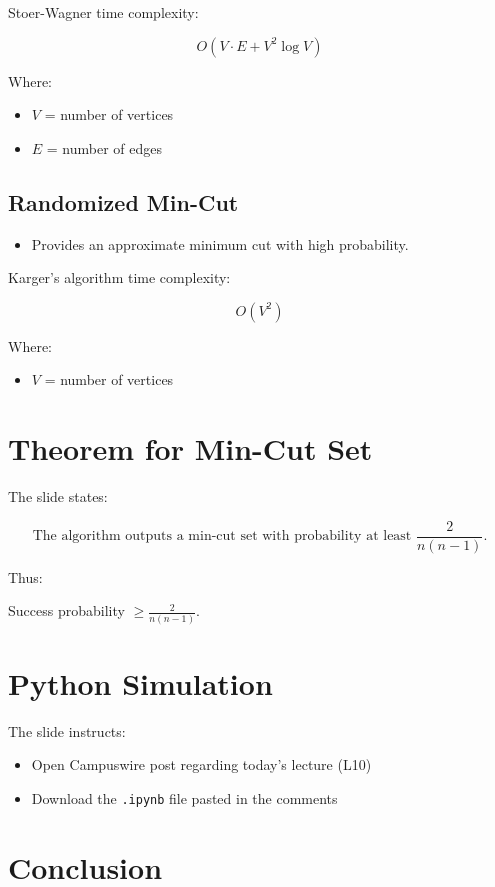 \documentclass[12pt]{article}
\begin{document}
Stoer-Wagner time complexity:

\[
O(V \cdot E + V^2 \log V)
\]

Where:
\begin{itemize}
    \item $V$ = number of vertices
    \item $E$ = number of edges
\end{itemize}

\subsection*{Randomized Min-Cut}

\begin{itemize}
    \item Provides an approximate minimum cut with high probability.
\end{itemize}

Karger’s algorithm time complexity:

\[
O(V^2)
\]

Where:
\begin{itemize}
    \item $V$ = number of vertices
\end{itemize}

\section{Theorem for Min-Cut Set}

The slide states:

\[
\text{The algorithm outputs a min-cut set with probability at least } \frac{2}{n(n-1)}.
\]

Thus:

Success probability $\ge \frac{2}{n(n-1)}$.

\section{Python Simulation}

The slide instructs:

\begin{itemize}
    \item Open Campuswire post regarding today’s lecture (L10)
    \item Download the \texttt{.ipynb} file pasted in the comments
\end{itemize}

\section*{Conclusion}
\end{document}
